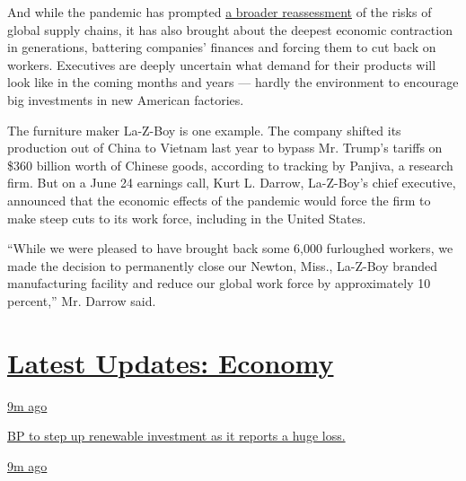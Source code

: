 And while the pandemic has prompted
\href{https://www.nytimes.com/2020/03/05/business/coronavirus-globalism.html}{a
broader reassessment} of the risks of global supply chains, it has also
brought about the deepest economic contraction in generations, battering
companies' finances and forcing them to cut back on workers. Executives
are deeply uncertain what demand for their products will look like in
the coming months and years --- hardly the environment to encourage big
investments in new American factories.

The furniture maker La-Z-Boy is one example. The company shifted its
production out of China to Vietnam last year to bypass Mr. Trump's
tariffs on \$360 billion worth of Chinese goods, according to tracking
by Panjiva, a research firm. But on a June 24 earnings call, Kurt L.
Darrow, La-Z-Boy's chief executive, announced that the economic effects
of the pandemic would force the firm to make steep cuts to its work
force, including in the United States.

``While we were pleased to have brought back some 6,000 furloughed
workers, we made the decision to permanently close our Newton, Miss.,
La-Z-Boy branded manufacturing facility and reduce our global work force
by approximately 10 percent,'' Mr. Darrow said.

\hypertarget{latest-updates-economy}{%
\section{\texorpdfstring{\href{https://www.nytimes.com/live/2020/08/04/business/stock-market-today-coronavirus?action=click\&pgtype=Article\&state=default\&region=MAIN_CONTENT_1\&context=storylines_live_updates}{Latest
Updates:
Economy}}{Latest Updates: Economy}}\label{latest-updates-economy}}

\href{https://www.nytimes.com/live/2020/08/04/business/stock-market-today-coronavirus?action=click\&pgtype=Article\&state=default\&region=MAIN_CONTENT_1\&context=storylines_live_updates\#bp-to-step-up-renewable-investment-as-it-reports-a-huge-loss}{9m
ago}

\href{https://www.nytimes.com/live/2020/08/04/business/stock-market-today-coronavirus?action=click\&pgtype=Article\&state=default\&region=MAIN_CONTENT_1\&context=storylines_live_updates\#bp-to-step-up-renewable-investment-as-it-reports-a-huge-loss}{BP
to step up renewable investment as it reports a huge loss.}

\href{https://www.nytimes.com/live/2020/08/04/business/stock-market-today-coronavirus?action=click\&pgtype=Article\&state=default\&region=MAIN_CONTENT_1\&context=storylines_live_updates\#some-caterers-are-finding-creative-ways-to-keep-their-businesses-afloat}{9m
ago}

